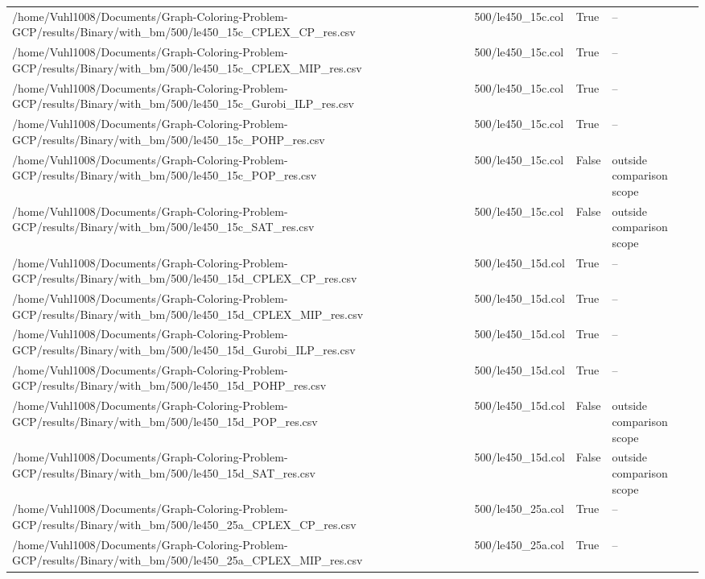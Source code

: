 \begin{table}[htbp]
\begin{tabular}{llll}
/home/Vuhl1008/Documents/Graph-Coloring-Problem-GCP/results/Binary/with\_bm/500/le450\_15c\_CPLEX\_CP\_res.csv & 500/le450\_15c.col & True & -- \\
/home/Vuhl1008/Documents/Graph-Coloring-Problem-GCP/results/Binary/with\_bm/500/le450\_15c\_CPLEX\_MIP\_res.csv & 500/le450\_15c.col & True & -- \\
/home/Vuhl1008/Documents/Graph-Coloring-Problem-GCP/results/Binary/with\_bm/500/le450\_15c\_Gurobi\_ILP\_res.csv & 500/le450\_15c.col & True & -- \\
/home/Vuhl1008/Documents/Graph-Coloring-Problem-GCP/results/Binary/with\_bm/500/le450\_15c\_POHP\_res.csv & 500/le450\_15c.col & True & -- \\
/home/Vuhl1008/Documents/Graph-Coloring-Problem-GCP/results/Binary/with\_bm/500/le450\_15c\_POP\_res.csv & 500/le450\_15c.col & False & outside comparison scope \\
/home/Vuhl1008/Documents/Graph-Coloring-Problem-GCP/results/Binary/with\_bm/500/le450\_15c\_SAT\_res.csv & 500/le450\_15c.col & False & outside comparison scope \\
/home/Vuhl1008/Documents/Graph-Coloring-Problem-GCP/results/Binary/with\_bm/500/le450\_15d\_CPLEX\_CP\_res.csv & 500/le450\_15d.col & True & -- \\
/home/Vuhl1008/Documents/Graph-Coloring-Problem-GCP/results/Binary/with\_bm/500/le450\_15d\_CPLEX\_MIP\_res.csv & 500/le450\_15d.col & True & -- \\
/home/Vuhl1008/Documents/Graph-Coloring-Problem-GCP/results/Binary/with\_bm/500/le450\_15d\_Gurobi\_ILP\_res.csv & 500/le450\_15d.col & True & -- \\
/home/Vuhl1008/Documents/Graph-Coloring-Problem-GCP/results/Binary/with\_bm/500/le450\_15d\_POHP\_res.csv & 500/le450\_15d.col & True & -- \\
/home/Vuhl1008/Documents/Graph-Coloring-Problem-GCP/results/Binary/with\_bm/500/le450\_15d\_POP\_res.csv & 500/le450\_15d.col & False & outside comparison scope \\
/home/Vuhl1008/Documents/Graph-Coloring-Problem-GCP/results/Binary/with\_bm/500/le450\_15d\_SAT\_res.csv & 500/le450\_15d.col & False & outside comparison scope \\
/home/Vuhl1008/Documents/Graph-Coloring-Problem-GCP/results/Binary/with\_bm/500/le450\_25a\_CPLEX\_CP\_res.csv & 500/le450\_25a.col & True & -- \\
/home/Vuhl1008/Documents/Graph-Coloring-Problem-GCP/results/Binary/with\_bm/500/le450\_25a\_CPLEX\_MIP\_res.csv & 500/le450\_25a.col & True & -- \\

\end{tabular}
\end{table}
